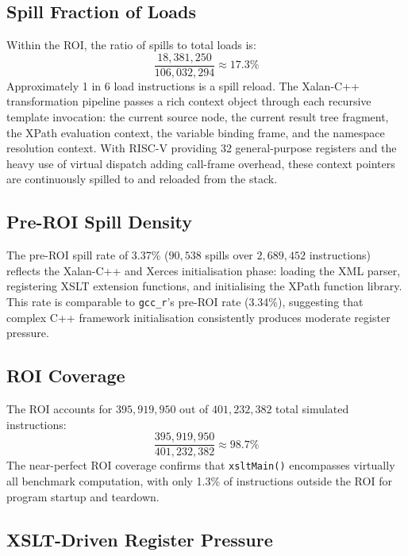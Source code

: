 \documentclass[conference]{IEEEtran}
\begin{document}
\subsection{Spill Fraction of Loads}

Within the ROI, the ratio of spills to total loads is:
\[
\frac{18{,}381{,}250}{106{,}032{,}294} \approx 17.3\%
\]
Approximately 1 in 6 load instructions is a spill reload.
The Xalan-C++ transformation pipeline passes a rich context object
through each recursive template invocation: the current source node,
the current result tree fragment, the XPath evaluation context, the
variable binding frame, and the namespace resolution context. With
RISC-V providing 32 general-purpose registers and the heavy use of
virtual dispatch adding call-frame overhead, these context pointers
are continuously spilled to and reloaded from the stack.

\subsection{Pre-ROI Spill Density}

The pre-ROI spill rate of 3.37\% ($90{,}538$ spills over
$2{,}689{,}452$ instructions) reflects the Xalan-C++ and Xerces
initialisation phase: loading the XML parser, registering XSLT
extension functions, and initialising the XPath function library.
This rate is comparable to \texttt{gcc\_r}'s pre-ROI rate (3.34\%),
suggesting that complex C++ framework initialisation consistently
produces moderate register pressure.

\subsection{ROI Coverage}

The ROI accounts for $395{,}919{,}950$ out of $401{,}232{,}382$
total simulated instructions:
\[
\frac{395{,}919{,}950}{401{,}232{,}382} \approx 98.7\%
\]
The near-perfect ROI coverage confirms that \texttt{xsltMain()}
encompasses virtually all benchmark computation, with only 1.3\%
of instructions outside the ROI for program startup and teardown.

\subsection{XSLT-Driven Register Pressure}
\end{document}
